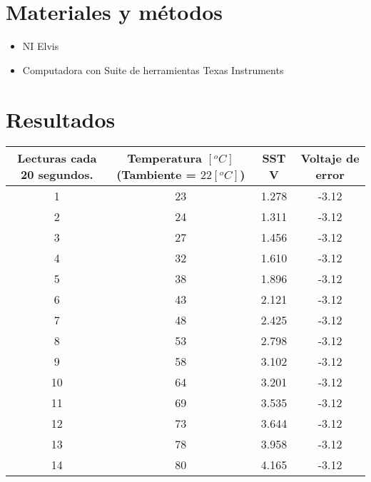 \documentclass[]{article}
\begin{document}
\section{Materiales y métodos}

	\begin{itemize}
		\item NI Elvis
		\item Computadora con Suite de herramientas Texas Instruments
	\end{itemize}
	
\section{Resultados}


\begin{table}[h!]
	\begin{tabular}{|c|c|c|c|}
		\hline
		Lecturas cada 20 segundos. & Temperatura $[^oC]$ (Tambiente = $22[^oC]$) & SST V & Voltaje de error \\ \hline
		1                          & 23                                & 1.278 & -3.12            \\ \hline
		2                          & 24                                & 1.311 & -3.12            \\ \hline
		3                          & 27                                & 1.456 & -3.12            \\ \hline
		4                          & 32                                & 1.610 & -3.12            \\ \hline
		5                          & 38                                & 1.896 & -3.12            \\ \hline
		6                          & 43                                & 2.121 & -3.12            \\ \hline
		7                          & 48                                & 2.425 & -3.12            \\ \hline
		8                          & 53                                & 2.798 & -3.12            \\ \hline
		9                          & 58                                & 3.102 & -3.12            \\ \hline
		10                         & 64                                & 3.201 & -3.12            \\ \hline
		11                         & 69                                & 3.535 & -3.12            \\ \hline
		12                         & 73                                & 3.644 & -3.12            \\ \hline
		13                         & 78                                & 3.958 & -3.12            \\ \hline
		14                         & 80                                & 4.165 & -3.12            \\ \hline
	\end{tabular}
\end{table}
\end{document}
